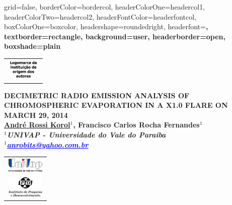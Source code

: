 \documentclass[a0paper,portrait]{baposter}
\begin{document}
\begin{poster}{
grid=false,
borderColor=bordercol, %
headerColorOne=headercol1, %
headerColorTwo=headercol2, %
headerFontColor=headerfontcol, %
boxColorOne=boxcolor, %
headershape=roundedright, %
headerfont=\Large\sf\bf, %
textborder=rectangle,
background=user,
headerborder=open, %
boxshade=plain
}
{\begin{tabular}{c} \includegraphics[height=1cm]{logomarca.png}\\
\end{tabular}
}  
%
%
{\bf  \LARGE {DECIMETRIC RADIO EMISSION ANALYSIS OF CHROMOSPHERIC EVAPORATION IN A X1.0 FLARE ON MARCH 29, 2014} \\ %
\vspace{0.2cm} 
\footnotesize \underline{André Rossi Korol}$^1$, Francisco Carlos Rocha Fernandes$^1$\\  %
\footnotesize $^1$\it {UNIVAP - Universidade do Vale do Paraíba}\\ %
\footnotesize $^1$\it{\textcolor{blue}{\underline{anrobits@yahoo.com.br}}}}

{\begin{tabular}{c} \includegraphics[height=0.75cm]{UNIVAP-SF.png}\\
\includegraphics[height=1cm]{ipd2-sf.png}
\end{tabular}
}  

\end{poster}
\end{document}
